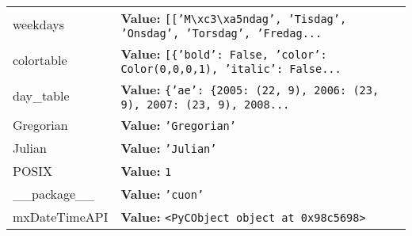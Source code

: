 \begin{longtable}{|p{\varnamewidth}|p{\vardescrwidth}|l}
\cline{1-2}
\raggedright w\-e\-e\-k\-d\-a\-y\-s\- & \raggedright \textbf{Value:} 
{\tt \texttt{[}\texttt{[}\texttt{'}\texttt{M{\textbackslash}xc3{\textbackslash}xa5ndag}\texttt{'}\texttt{, }\texttt{'}\texttt{Tisdag}\texttt{'}\texttt{, }\texttt{'}\texttt{Onsdag}\texttt{'}\texttt{, }\texttt{'}\texttt{Torsdag}\texttt{'}\texttt{, }\texttt{'}\texttt{Fredag}\texttt{...}}&\\
\cline{1-2}
\raggedright c\-o\-l\-o\-r\-t\-a\-b\-l\-e\- & \raggedright \textbf{Value:} 
{\tt \texttt{[}\texttt{\{}\texttt{'}\texttt{bold}\texttt{'}\texttt{: }False\texttt{, }\texttt{'}\texttt{color}\texttt{'}\texttt{: }Color(0,0,0,1)\texttt{, }\texttt{'}\texttt{italic}\texttt{'}\texttt{: }False\texttt{...}}&\\
\cline{1-2}
\raggedright d\-a\-y\-\_\-t\-a\-b\-l\-e\- & \raggedright \textbf{Value:} 
{\tt \texttt{\{}\texttt{'}\texttt{ae}\texttt{'}\texttt{: }\texttt{\{}2005\texttt{: }\texttt{(}22\texttt{, }9\texttt{)}\texttt{, }2006\texttt{: }\texttt{(}23\texttt{, }9\texttt{)}\texttt{, }2007\texttt{: }\texttt{(}23\texttt{, }9\texttt{)}\texttt{, }2008\texttt{...}}&\\
\cline{1-2}
\raggedright G\-r\-e\-g\-o\-r\-i\-a\-n\- & \raggedright \textbf{Value:} 
{\tt \texttt{'}\texttt{Gregorian}\texttt{'}}&\\
\cline{1-2}
\raggedright J\-u\-l\-i\-a\-n\- & \raggedright \textbf{Value:} 
{\tt \texttt{'}\texttt{Julian}\texttt{'}}&\\
\cline{1-2}
\raggedright P\-O\-S\-I\-X\- & \raggedright \textbf{Value:} 
{\tt 1}&\\
\cline{1-2}
\raggedright \_\-\_\-p\-a\-c\-k\-a\-g\-e\-\_\-\_\- & \raggedright \textbf{Value:} 
{\tt \texttt{'}\texttt{cuon}\texttt{'}}&\\
\cline{1-2}
\raggedright m\-x\-D\-a\-t\-e\-T\-i\-m\-e\-A\-P\-I\- & \raggedright \textbf{Value:} 
{\tt {\textless}PyCObject object at 0x98c5698{\textgreater}}&\\
\cline{1-2}
\end{longtable}

